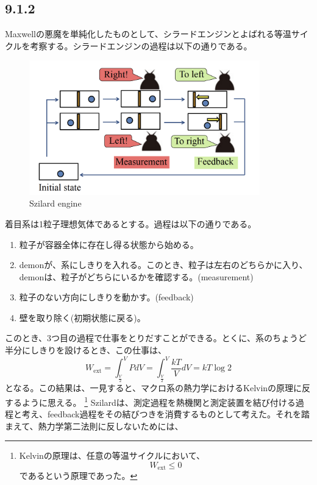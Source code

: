 \documentclass[a4paper,11pt]{jsarticle}
\numberwithin{equation}{section}
\begin{document}
\subsection*{9.1.2}
Maxwellの悪魔を単純化したものとして、シラードエンジンとよばれる等温サイクルを考察する。シラードエンジンの過程は以下の通りである。\\
\begin{figure}[H]
    \begin{center}
    \includegraphics[width=100mm]{Szilard.png}
    \end{center}
    \caption{Szilard engine}
    \label{fig:Szilard}
\end{figure}
着目系は1粒子理想気体であるとする。過程は以下の通りである。
\begin{enumerate}
    \item 粒子が容器全体に存在し得る状態から始める。
    \item demonが、系にしきりを入れる。このとき、粒子は左右のどちらかに入り、demonは、粒子がどちらにいるかを確認する。(measurement)
    \item 粒子のない方向にしきりを動かす。(feedback)
    \item 壁を取り除く(初期状態に戻る)。
\end{enumerate}
このとき、3つ目の過程で仕事をとりだすことができる。とくに、系のちょうど半分にしきりを設けるとき、この仕事は、
\begin{equation}
    W_{\text{ext}} = \int_{\frac{V}{2}}^V PdV = \int_{\frac{V}{2}}^V \frac{kT}{V}dV = kT\log 2
\end{equation}
となる。この結果は、一見すると、マクロ系の熱力学におけるKelvinの原理に反するように思える。
\footnote{
    Kelvinの原理は、任意の等温サイクルにおいて、
    \begin{equation}
        W_{\text{ext}} \leq 0
    \end{equation}
    であるという原理であった。
}
Szilardは、測定過程を熱機関と測定装置を結び付ける過程と考え、feedback過程をその結びつきを消費するものとして考えた。それを踏まえて、熱力学第二法則に反しないためには、
\end{document}
